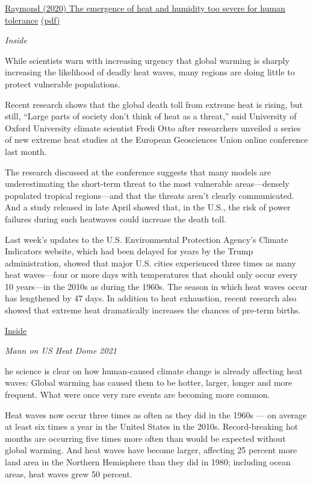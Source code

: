 \documentclass[
]{book}
\begin{document}
\href{https://advances.sciencemag.org/content/6/19/eaaw1838}{Raymond (2020) The emergence of heat and humidity too severe for human tolerance}
\href{pdf/Raymond_2020_Human_Heat_Tolerance.pdf}{(pdf)}

\emph{Inside}

While scientists warn with increasing urgency that global warming is sharply increasing the likelihood of deadly heat waves, many regions are doing little to protect vulnerable populations.

Recent research shows that the global death toll from extreme heat is rising, but still, ``Large parts of society don't think of heat as a threat,'' said University of Oxford University climate scientist Fredi Otto after researchers unveiled a series of new extreme heat studies at the European Geosciences Union online conference last month.

The research discussed at the conference suggests that many models are underestimating the short-term threat to the most vulnerable areas---densely populated tropical regions---and that the threats aren't clearly communicated. And a study released in late April showed that, in the U.S., the risk of power failures during such heatwaves could increase the death toll.

Last week's updates to the U.S. Environmental Protection Agency's Climate Indicators website, which had been delayed for years by the Trump administration, showed that major U.S. cities experienced three times as many heat waves---four or more days with temperatures that should only occur every 10 years---in the 2010s as during the 1960s. The season in which heat waves occur has lengthened by 47 days. In addition to heat exhaustion, recent research also showed that extreme heat dramatically increases the chances of pre-term births.

\href{https://insideclimatenews.org/news/16052021/extreme-heat-risks-climate-change/}{Inside}

\emph{Mann on US Heat Dome 2021}

he science is clear on how human-caused climate change is already affecting heat waves: Global warming has caused them to be hotter, larger, longer and more frequent. What were once very rare events are becoming more common.

Heat waves now occur three times as often as they did in the 1960s --- on average at least six times a year in the United States in the 2010s. Record-breaking hot months are occurring five times more often than would be expected without global warming. And heat waves have become larger, affecting 25 percent more land area in the Northern Hemisphere than they did in 1980; including ocean areas, heat waves grew 50 percent.
\end{document}
